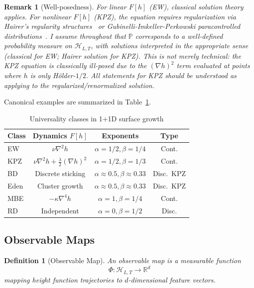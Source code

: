 \documentclass[aps,pre,reprint,amsmath,amssymb,superscriptaddress]{revtex4-2}
\newtheorem{definition}{Definition}
\newtheorem{remark}{Remark}
\newcommand{\calH}{\mathcal{H}}
\newcommand{\bbP}{\mathbb{P}}
\newcommand{\bbR}{\mathbb{R}}
\begin{document}
\begin{remark}[Well-posedness]
For linear $F[h]$ (EW), classical solution theory applies. For nonlinear $F[h]$ (KPZ), the equation requires regularization via Hairer's regularity structures~\cite{Hairer2013} or Gubinelli-Imkeller-Perkowski paracontrolled distributions~\cite{Gubinelli2015}. I assume throughout that $\bbP$ corresponds to a well-defined probability measure on $\calH_{L,T}$, with solutions interpreted in the appropriate sense (classical for EW; Hairer solution for KPZ). This is not merely technical: the KPZ equation is classically ill-posed due to the $(\nabla h)^2$ term evaluated at points where $h$ is only H\"older-$1/2$. All statements for KPZ should be understood as applying to the regularized/renormalized solution.
\end{remark}

Canonical examples are summarized in Table~\ref{tab:universality}.

\begin{table}[h]
\centering
\caption{Universality classes in 1+1D surface growth}
\label{tab:universality}
\small
\begin{tabular}{@{}lccc@{}}
\toprule
Class & Dynamics $F[h]$ & Exponents & Type \\
\midrule
EW & $\nu\nabla^2 h$ & $\alpha=1/2, \beta=1/4$ & Cont.\\
KPZ & $\nu\nabla^2 h + \frac{\lambda}{2}(\nabla h)^2$ & $\alpha=1/2, \beta=1/3$ & Cont.\\
BD & Discrete sticking & $\alpha\approx 0.5, \beta\approx 0.33$ & Disc.~KPZ \\
Eden & Cluster growth & $\alpha\approx 0.5, \beta\approx 0.33$ & Disc.~KPZ \\
MBE & $-\kappa\nabla^4 h$ & $\alpha=1, \beta=1/4$ & Cont.\\
RD & Independent & $\alpha=0, \beta=1/2$ & Disc.\\
\bottomrule
\end{tabular}
\end{table}

\subsection{Observable Maps}

\begin{definition}[Observable Map]
An observable map is a measurable function
\begin{equation}
\Phi: \calH_{L,T} \to \bbR^d
\end{equation}
mapping height function trajectories to $d$-dimensional feature vectors.
\end{definition}
\end{document}
